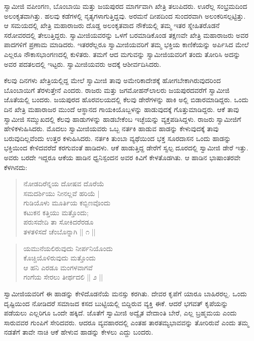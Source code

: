  ಸ್ವಾಮೀಜಿ ವಪೀಂಗಣ, ಬೊಂಬಾಯಿ ಮತ್ತು ಜಯಪುರದ ಮಾರ್ಗವಾಗಿ ಖೇತ್ರಿ ತಲುಪಿದರು. ಊರೆಲ್ಲ ಸಂಭ್ರಮದಿಂದ ಅಲಂಕೃತವಾಗಿತ್ತು. ಹಲವು ಕಡೆಗಳಲ್ಲಿ ನೃತ್ಯಗಳಾಗುತ್ತಿದ್ದವು. ಅರಮನೆ ದೀಪದಿಂದ ಸುಂದರವಾಗಿ ಅಲಂಕರಿಸಲ್ಪಟ್ಟಿತ್ತು. ಆ ಸಮಯದಲ್ಲಿ ಖೇತ್ರಿ ಮಹಾರಾಜರು ದೊಡ್ಡ ಅಲಂಕೃತವಾದ ನೌಕೆಯಲ್ಲಿ ತಮ್ಮ ಇತರ ಸ್ನೇಹಿತರೊಡನೆ ಸರೋವರದಲ್ಲಿ ತೇಲುತ್ತಿದ್ದರು. ಸ್ವಾಮೀಜಿಯವರನ್ನು ಒಳಗೆ ಬರಮಾಡಿಕೊಂಡ ತಕ್ಷಣವೇ ಖೇತ್ರಿ ಮಹಾರಾಜರು ಅವರ ಪಾದಗಳಿಗೆ ಪ್ರಣಾಮ ಮಾಡಿದರು. ಇತರರೆಲ್ಲರೂ ಸ್ವಾಮೀಜಿಯವರಿಗೆ ತಮ್ಮ ಭಕ್ತಿಯ ಕಾಣಿಕೆಯನ್ನು ಅರ್ಪಿಸಿದ ಮೇಲೆ ಎಲ್ಲರೂ ನೌಕಾಸಭಾಂಗಣದಲ್ಲಿ ಕುಳಿತರು. ತಮಗೆ ಆದ ಮಗುವನ್ನು ಸ್ವಾಮೀಜಿಯವರಿಗೆ ತಂದು ತೋರಿಸಿ ಅದನ್ನು ಅವರ ಪದತಲದಲ್ಲಿ ಇಟ್ಟರು. ಸ್ವಾಮೀಜಿಯವರು ಅದಕ್ಕೆ ಆಶೀರ್ವದಿಸಿದರು. 

 ಕೆಲವು ದಿನಗಳು ಖೇತ್ರಿಯಲ್ಲಿದ್ದ ಮೇಲೆ ಸ್ವಾಮೀಜಿ ತಾವು ಅಮೇರಿಕಾದೇಶಕ್ಕೆ ಹೋಗಬೇಕಾಗಿರುವುದರಿಂದ ಬೊಂಬಾಯಿಗೆ ತೆರಳುತ್ತೇನೆ ಎಂದರು. ರಾಜರು ಮತ್ತು ಜಗಮೋಹನ್‍ಲಾಲರು ಜಯಪುರದವರೆಗೆ ಸ್ವಾಮೀಜಿ ಜೊತೆಯಲ್ಲಿ ಬಂದರು. ಜಯಪುರದ ಹೊರವಲಯದಲ್ಲಿ ಕೆಲವು ಡೇರೆಗಳನ್ನು ಹಾಕಿ ಅಲ್ಲಿ ಬಿಡಾರಮಾಡಿದ್ದರು. ಒಂದು ದಿನ ಖೇತ್ರಿ ಮಹಾರಾಜರ ಮುಂದೆ ಆಸ್ಥಾನದ ಗಾಯಕಿಯೊಬ್ಬಳನ್ನು ಹಾಡುವುದಕ್ಕೆ ಗೊತ್ತುಮಾಡಿದ್ದರು. ಆಕೆ ತಾವು ಸ್ವಾಮೀಜಿ ಸಮ್ಮುಖದಲ್ಲಿ ಕೆಲವು ಹಾಡುಗಳನ್ನು ಹಾಡಬೇಕೆಂಬ ಇಚ್ಛೆಯನ್ನು ವ್ಯಕ್ತಪಡಿಸಿದ್ದಳು. ರಾಜರು ಸ್ವಾಮೀಜಿಗೆ ಹೇಳಿಕಳುಹಿಸಿದರು. ಮೊದಲು ಸ್ವಾಮೀಜಿಯವರು ಒಬ್ಬ ನರ್ತಕಿ ಹಾಡುವ ಹಾಡನ್ನು ಕೇಳುವುದಕ್ಕೆ ತಾವು ಬರುವುದಿಲ್ಲವೆಂದು ಉತ್ತರ ಕಳುಹಿಸಿದರು. ನರ್ತಕಿ ತುಂಬಾ ವ್ಯಥೆಯಿಂದ ಭಕ್ತ ಸೂರದಾಸನ ಒಂದು ಹಾಡನ್ನು ಭಕ್ತಿಯಿಂದ ಕೇಳಿದವರೆದೆ ಕರಗುವಂತೆ ಹಾಡಿದಳು. ಆಕೆ ಹಾಡುತ್ತಿದ್ದ ಡೇರೆಗೆ ಸ್ವಲ್ಪ ದೂರದಲ್ಲಿ ಸ್ವಾಮೀಜಿ ಡೇರೆ ಇತ್ತು. ಅವರು ಬರದೇ ಇದ್ದರೂ ಆಕೆಯ ಹಾಡಿನ ಧ್ವನಿಸ್ಪಂದನ ಅವರ ಕಿವಿಗೆ ಕೇಳತೊಡಗಿತು. ಆ ಹಾಡಿನ ಭಾಷಾಂತರವೇ ಕೆಳಗಿನದು:

\begin{verse}
ನೋಡದಿರೆನ್ನಯ ದೋಷವ ದೊರೆಯೆ\\ಸಮದರ್ಶಿಯು ನೀನಲ್ಲವೆ ಹರಿಯೆ | \\ಗುಡಿಯೊಳು ಮೂರ್ತಿಯ ಕಬ್ಬಿಣವೊಂದು \\ಕಟುಕನ ಕತ್ತಿಯು ಮತ್ತೊಂದು;\\ಪರುಸವೇದಿ ತಾ ಸೋಕಿದರೆರಡೂ \\ತಳತಳಿಸದೆ ಚೆಂಬೊನ್ನಾಗಿ || ೧ || 
\end{verse}

\begin{verse}
ಯಮುನೆಯಲಿರುವುದು ನೀರ್ಪನಿಯೊಂದು \\ಕೊಚ್ಚಿಯೊಳಿರುವುದು ಮತ್ತೊಂದು\\ಆ ಹನಿ ಎರಡೂ ಮಂಗಳವಾಗವೆ\\ಗಂಗೆಯ ಸೇರಲು ತೀರ್ಥದಲಿ || ೨ || 
\end{verse}

 ಸ್ವಾಮೀಜಿಯವರಿಗೆ ಈ ಹಾಡನ್ನು ಕೇಳಿದೊಡನೆಯೆ ಮನಸ್ಸು ಕರಗಿತು. ದೇವರ ಕೃಪೆಗೆ ಯಾರೂ ಬಾಹಿರರಲ್ಲ. ಒಂದು ದೃಷ್ಟಿಯಿಂದ ನೋಡಿದರೆ ಸಮಾಜದ ಕಸದ ಬುಟ್ಟಿಯಲ್ಲಿ ಬಿದ್ದಿರುವ ವ್ಯಕ್ತಿ ಈಕೆ. ಆದರೆ ಭಗವತ್ ಕೃಪೆಯನ್ನು ಪಡೆಯಲು ಎಲ್ಲರಿಗೂ ಒಂದೇ ಹಕ್ಕಿದೆ. ಜೊತೆಗೆ ಸ್ವಾಮೀಜಿ ಅದ್ವೈತ ವೇದಾಂತಿ ಬೇರೆ, ಎಲ್ಲ ಬ್ರಹ್ಮಮಯ ಎಂದು ಸಾರುವವರ ಗುಂಪಿಗೆ ಸೇರಿದವರು. ಆದರೂ ವ್ಯವಹಾರದಲ್ಲಿ ಎಂತಹ ತಾರತಮ್ಯಭಾವವನ್ನು ತೋರಿರುವೆ ಎಂದು ತಮ್ಮ ನಡತೆಗೆ ತಾವೇ ನಾಚಿ ಆಕೆ ಹೇಳುವ ಹಾಡನ್ನು ಕೇಳಲು ಎದ್ದು ಬಂದರು. 

